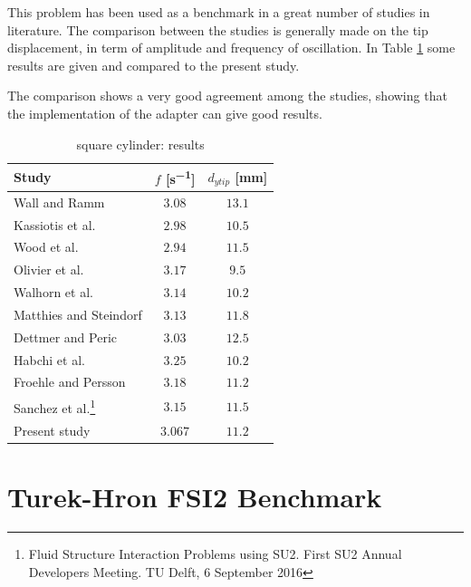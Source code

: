 This problem has been used as a benchmark in a great number of studies in literature. The comparison between the studies is generally made on the tip displacement, in term of amplitude and frequency of oscillation. In Table \ref{table:sq-res} some results are given and compared to the present study.

The comparison shows a very good agreement among the studies, showing that the implementation of the adapter can give good results.

\begin{table}[!htb]
	\begin{center}
		\begin{tabular}{ l | c  c } 
			Study & $f$ [\si{s^{-1}}] & $d_{y tip}$ [\si{mm}]   \\ 
			\hline
            Wall and Ramm \cite{ramm1998fluid} & $3.08$ & $13.1$ \\
            Kassiotis et al. \cite{kassiotis2011nonlinear} & $2.98$ & $10.5$ \\
            Wood et al. \cite{wood2010partitioned} & $2.94$ & $11.5$ \\
            Olivier et al. \cite{olivier2009fluid} & $3.17$ & $9.5$ \\
            Walhorn et al. \cite{walhorn2002space} & $3.14$ & $10.2$ \\
            Matthies and Steindorf \cite{matthies2003partitioned} & $3.13$ & $11.8$ \\ 
            Dettmer and Peric \cite{dettmer2006computational} & $3.03$ & $12.5$ \\
            Habchi et al. \cite{habchi2013partitioned} & $3.25$ & $10.2$ \\
            Froehle and Persson \cite{froehle2014high} & $3.18$ & $11.2$ \\
            Sanchez et al.\footnote{Fluid Structure Interaction Problems using SU2. First SU2 Annual Developers Meeting. TU Delft, 6 September 2016}  & $3.15$ & $11.5$ \\
            Present study    & $3.067$ & $11.2$ \\
            
		\end{tabular}
	\end{center}
	\caption{square cylinder: results}
	\label{table:sq-res}
\end{table}


\newpage

\section{Turek-Hron FSI2 Benchmark}
\label{sec:FSI2}


